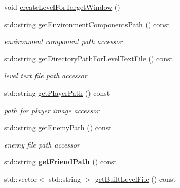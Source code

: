 \begin{DoxyCompactItemize}
void \hyperlink{class_pre_built_level_ac55f77e0ee464325cdd3ffa91292b0c8}{create\+Level\+For\+Target\+Window} ()
\item 
\hypertarget{class_pre_built_level_a9dad873a97adcdaf295fab180e121432}{}\label{class_pre_built_level_a9dad873a97adcdaf295fab180e121432} 
std\+::string \hyperlink{class_pre_built_level_a9dad873a97adcdaf295fab180e121432}{get\+Environment\+Components\+Path} () const
\begin{DoxyCompactList}\small\item\em environment component path accessor \end{DoxyCompactList}\item 
\hypertarget{class_pre_built_level_a71f044fcb4e420d230ec08fb99f052b7}{}\label{class_pre_built_level_a71f044fcb4e420d230ec08fb99f052b7} 
std\+::string \hyperlink{class_pre_built_level_a71f044fcb4e420d230ec08fb99f052b7}{get\+Directory\+Path\+For\+Level\+Text\+File} () const
\begin{DoxyCompactList}\small\item\em level text file path accessor \end{DoxyCompactList}\item 
\hypertarget{class_pre_built_level_a521829d7ce603cca33415de35cf848ea}{}\label{class_pre_built_level_a521829d7ce603cca33415de35cf848ea} 
std\+::string \hyperlink{class_pre_built_level_a521829d7ce603cca33415de35cf848ea}{get\+Player\+Path} () const
\begin{DoxyCompactList}\small\item\em path for player image accessor \end{DoxyCompactList}\item 
\hypertarget{class_pre_built_level_acbde88b4ef5e5c62612baa33d0940aa4}{}\label{class_pre_built_level_acbde88b4ef5e5c62612baa33d0940aa4} 
std\+::string \hyperlink{class_pre_built_level_acbde88b4ef5e5c62612baa33d0940aa4}{get\+Enemy\+Path} () const
\begin{DoxyCompactList}\small\item\em enemy file path accessor \end{DoxyCompactList}\item 
\hypertarget{class_pre_built_level_afaff0fcfd5b13180fdbe973ea10a27f7}{}\label{class_pre_built_level_afaff0fcfd5b13180fdbe973ea10a27f7} 
std\+::string {\bfseries get\+Friend\+Path} () const
\item 
\hypertarget{class_pre_built_level_a5c7c3ad889ff5eab0cfb367945523d6b}{}\label{class_pre_built_level_a5c7c3ad889ff5eab0cfb367945523d6b} 
std\+::vector$<$ std\+::string $>$ \hyperlink{class_pre_built_level_a5c7c3ad889ff5eab0cfb367945523d6b}{get\+Built\+Level\+File} () const

\end{DoxyCompactItemize}

